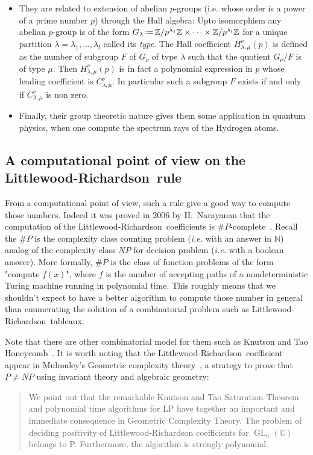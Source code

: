 \documentclass[12pt]{article}
\newcommand{\LR}{Littlewood-Richardson\ }
\newcommand{\N}{{\mathbb N}}
\newcommand{\C}{{\mathbb C}}
\newcommand{\Z}{{\mathbb Z}}
\newcommand{\GL}{\operatorname{GL}}
\newcommand{\eqdef}{\mbox{\,\raisebox{0.2ex}{\scriptsize\ensuremath{\mathrm:}}\ensuremath{=}\,}} %
\newcommand{\ie}{\textit{i.e.}\xspace}
\begin{document}
\begin{itemize}
  \item They are related to extension of abelian $p$-groups (i.e. whose order
    is a power of a prime number $p$) through the Hall algebra: Upto
    isomorphism any abelian $p$-group is of the form
    $G_\lambda\eqdef\Z/p^{\lambda_1}\Z\times\dots\times\Z/p^{\lambda_{l}}\Z$ for a
    unique partition $\lambda=\lambda_1,\dots,\lambda_{l}$ called its
    \emph{type}. The Hall coefficient $H_{\lambda,\mu}^{\nu}(p)$ is defined as
    the number of subgroup $F$ of $G_\nu$ of type $\lambda$ such that the
    quotient $G_\nu/F$ is of type $\mu$. Then $H_{\lambda,\mu}^{\nu}(p)$ is in
    fact a polynomial expression in $p$ whose leading coefficient is
    $C_{\lambda,\mu}^{\nu}$. In particular such a subgroup $F$ exists if and
    only if $C_{\lambda,\mu}^{\nu}$ is non zero.
\item Finally, their group theoretic nature gives them some application in
  quantum physics, when one compute the spectrum rays of the Hydrogen atoms.
\end{itemize}

\subsection{A computational point of view on the \LR rule}

From a computational point of view, such a rule give a good way to compute
those numbers. Indeed it was proved in 2006 by H.~Narayanan that the
computation of the \LR coefficients is
$\#P$-complete~\cite{Narayanan06}. Recall the $\#P$ is the complexity class
counting problem (\ie with an answer in $\N$) analog of the complexity class
$NP$ for decision problem (\ie with a boolean answer). More formally, $\#P$
is the class of function problems of the form "compute $f(x)$", where $f$ is
the number of accepting paths of a nondeterministic Turing machine running in
polynomial time. This roughly means that we shouldn't expect to have a better
algorithm to compute those number in general than enumerating the solution of
a combinatorial problem such as \LR tableaux.

Note that there are other combinatorial model for them such as Knutson and Tao
Honeycomb~\cite{KnutsonTao99}. It is worth noting that the \LR coefficient
appear in Mulmuley's Geometric complexity theory~\cite{Mulmuley12}, a strategy
to prove that $P\neq NP$ using invariant theory and algebraic geometry:
\begin{quotation}
  We point out that the remarkable Knutson and Tao Saturation Theorem and
  polynomial time algorithms for LP have together an important and immediate
  consequence in Geometric Complexity Theory. The problem of deciding
  positivity of Littlewood-Richardson coefficients for $\GL_n(\C)$ belongs to
  P. Furthermore, the algorithm is strongly polynomial.
\end{quotation}
\end{document}
